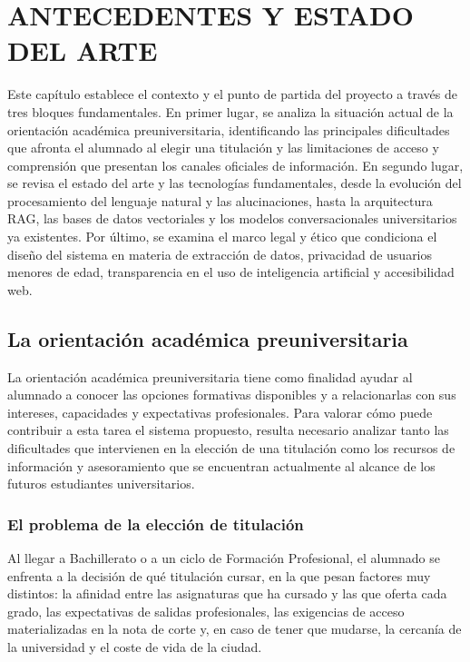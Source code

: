 \chapter{ANTECEDENTES Y ESTADO DEL ARTE}
\label{cap:antecedentes}


Este capítulo establece el contexto y el punto de partida del proyecto a través de tres bloques fundamentales. En primer lugar, se analiza la situación actual de la orientación académica preuniversitaria, identificando las principales dificultades que afronta el alumnado al elegir una titulación y las limitaciones de acceso y comprensión que presentan los canales oficiales de información. En segundo lugar, se revisa el estado del arte y las tecnologías fundamentales, desde la evolución del procesamiento del lenguaje natural y las alucinaciones, hasta la arquitectura RAG, las bases de datos vectoriales y los modelos conversacionales universitarios ya existentes. Por último, se examina el marco legal y ético que condiciona el diseño del sistema en materia de extracción de datos, privacidad de usuarios menores de edad, transparencia en el uso de inteligencia artificial y accesibilidad web.

\section{La orientación académica preuniversitaria}

La orientación académica preuniversitaria tiene como finalidad ayudar al alumnado a conocer las opciones formativas disponibles y a relacionarlas con sus intereses, capacidades y expectativas profesionales. Para valorar cómo puede contribuir a esta tarea el sistema propuesto, resulta necesario analizar tanto las dificultades que intervienen en la elección de una titulación como los recursos de información y asesoramiento que se encuentran actualmente al alcance de los futuros estudiantes universitarios.

\subsection{El problema de la elección de titulación}


Al llegar a Bachillerato o a un ciclo de Formación Profesional, el alumnado se enfrenta a la decisión de qué titulación cursar, en la que pesan factores muy distintos: la afinidad entre las asignaturas que ha cursado y las que oferta cada grado, las expectativas de salidas profesionales, las exigencias de acceso materializadas en la nota de corte y, en caso de tener que mudarse, la cercanía de la universidad y el coste de vida de la ciudad.

